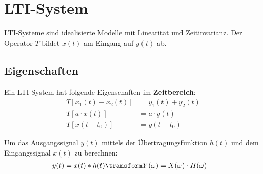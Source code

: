 \section{LTI-System}
LTI-Systeme sind idealisierte Modelle mit Linearität und Zeitinvarianz. Der Operator $T$ bildet $x(t)$ am Eingang auf $y(t)$ ab.

\subsection{Eigenschaften}
Ein LTI-System hat folgende Eigenschaften im \textbf{Zeitbereich}:
\begin{align*}
	T[x_1(t) + x_2(t)] &= y_1(t) + y_2(t) \\
	T[a\cdot x(t)] &= a\cdot y(t) \\
	T[x(t - t_0)] &= y(t- t_0)
\end{align*}

\noindent Um das Ausgangssignal $y(t)$ mittels der Übertragungsfunktion $h(t)$ und dem Eingangssignal $x(t)$ zu berechnen:
\begin{align*}
	y(t) = x(t) * h(t) &\transform 	Y(\omega) = X(\omega) \cdot H(\omega)
\end{align*}


